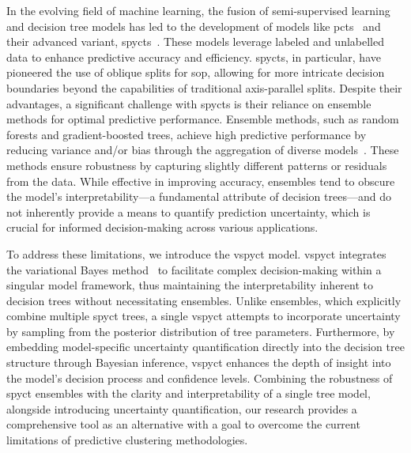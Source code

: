 \documentclass[3p,review,authoryear]{elsarticle}
\begin{document}
In the evolving field of machine learning, the fusion of semi-supervised learning and decision tree models has led to the development of models like \glspl{pct}~\citep{Kocev_2013} and their advanced variant, \glspl{spyct}~\citep{Stepi_nik_2021}.
These models leverage labeled and unlabelled data to enhance predictive accuracy and efficiency.
\Glspl{spyct}, in particular, have pioneered the use of oblique splits for \gls{sop}, allowing for more intricate decision boundaries beyond the capabilities of traditional axis-parallel splits.
Despite their advantages, a significant challenge with \glspl{spyct} is their reliance on ensemble methods for optimal predictive performance.
Ensemble methods, such as random forests and gradient-boosted trees, achieve high predictive performance by reducing variance and/or bias through the aggregation of diverse models~\cite{Breiman_2001, Kocev_2020, Friedman_2001}.
These methods ensure robustness by capturing slightly different patterns or residuals from the data.
While effective in improving accuracy, ensembles tend to obscure the model's interpretability—a fundamental attribute of decision trees—and do not inherently provide a means to quantify prediction uncertainty, which is crucial for informed decision-making across various applications.

To address these limitations, we introduce the \gls{vspyct} model.
\gls{vspyct} integrates the variational Bayes method~\citep{Blei_2017} to facilitate complex decision-making within a singular model framework, thus maintaining the interpretability inherent to decision trees without necessitating ensembles.
Unlike ensembles, which explicitly combine multiple \gls{spyct} trees, a single \gls{vspyct} attempts to incorporate uncertainty by sampling from the posterior distribution of tree parameters.
Furthermore, by embedding model-specific uncertainty quantification directly into the decision tree structure through Bayesian inference, \gls{vspyct} enhances the depth of insight into the model's decision process and confidence levels.
Combining the robustness of \gls{spyct} ensembles with the clarity and interpretability of a single tree model, alongside introducing uncertainty quantification, our research provides a comprehensive tool as an alternative with a goal to overcome the current limitations of predictive clustering methodologies.
\end{document}
